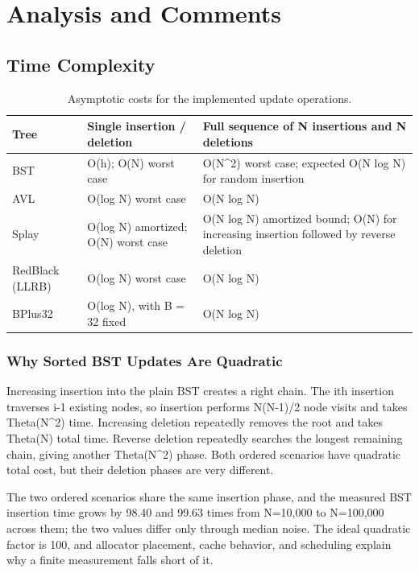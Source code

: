 \section{Analysis and Comments}

\subsection{Time Complexity}

\begin{table}[H]
\centering
\small
\caption{Asymptotic costs for the implemented update operations.}
\begin{tabularx}{\textwidth}{lXX}
\toprule
Tree & Single insertion / deletion & Full sequence of N insertions and N deletions \\
\midrule
BST & O(h); O(N) worst case & O(N\textasciicircum{}2) worst case; expected O(N log N) for random insertion \\
AVL & O(log N) worst case & O(N log N) \\
Splay & O(log N) amortized; O(N) worst case & O(N log N) amortized bound; O(N) for increasing insertion followed by reverse deletion \\
RedBlack (LLRB) & O(log N) worst case & O(N log N) \\
BPlus32 & O(log N), with B = 32 fixed & O(N log N) \\
\bottomrule
\end{tabularx}
\end{table}
\FloatBarrier

\subsubsection{Why Sorted BST Updates Are Quadratic}

Increasing insertion into the plain BST creates a right chain. The ith insertion traverses i-1 existing nodes, so insertion performs N(N-1)/\allowbreak{}2 node visits and takes Theta(N\textasciicircum{}2) time. Increasing deletion repeatedly removes the root and takes Theta(N) total time. Reverse deletion repeatedly searches the longest remaining chain, giving another Theta(N\textasciicircum{}2) phase. Both ordered scenarios have quadratic total cost, but their deletion phases are very different.

The two ordered scenarios share the same insertion phase, and the measured BST insertion time grows by 98.40 and 99.63 times from N=10,000 to N=100,000 across them; the two values differ only through median noise. The ideal quadratic factor is 100, and allocator placement, cache behavior, and scheduling explain why a finite measurement falls short of it.

